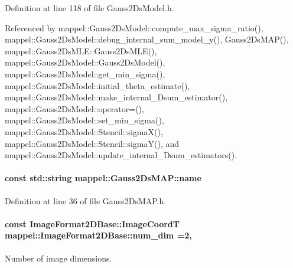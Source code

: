 Definition at line 118 of file Gauss2\+Ds\+Model.\+h.



Referenced by mappel\+::\+Gauss2\+Ds\+Model\+::compute\+\_\+max\+\_\+sigma\+\_\+ratio(), mappel\+::\+Gauss2\+Ds\+Model\+::debug\+\_\+internal\+\_\+sum\+\_\+model\+\_\+y(), Gauss2\+Ds\+M\+A\+P(), mappel\+::\+Gauss2\+Ds\+M\+L\+E\+::\+Gauss2\+Ds\+M\+L\+E(), mappel\+::\+Gauss2\+Ds\+Model\+::\+Gauss2\+Ds\+Model(), mappel\+::\+Gauss2\+Ds\+Model\+::get\+\_\+min\+\_\+sigma(), mappel\+::\+Gauss2\+Ds\+Model\+::initial\+\_\+theta\+\_\+estimate(), mappel\+::\+Gauss2\+Ds\+Model\+::make\+\_\+internal\+\_\+Dsum\+\_\+estimator(), mappel\+::\+Gauss2\+Ds\+Model\+::operator=(), mappel\+::\+Gauss2\+Ds\+Model\+::set\+\_\+min\+\_\+sigma(), mappel\+::\+Gauss2\+Ds\+Model\+::\+Stencil\+::sigma\+X(), mappel\+::\+Gauss2\+Ds\+Model\+::\+Stencil\+::sigma\+Y(), and mappel\+::\+Gauss2\+Ds\+Model\+::update\+\_\+internal\+\_\+Dsum\+\_\+estimators().

\paragraph[{\texorpdfstring{name}{name}}]{\setlength{\rightskip}{0pt plus 5cm}const std\+::string mappel\+::\+Gauss2\+Ds\+M\+A\+P\+::name\hspace{0.3cm}{\ttfamily [static]}}\hypertarget{classmappel_1_1Gauss2DsMAP_adb290940195572b2e22c3c8fce3f11c9}{}\label{classmappel_1_1Gauss2DsMAP_adb290940195572b2e22c3c8fce3f11c9}


Definition at line 36 of file Gauss2\+Ds\+M\+A\+P.\+h.

\paragraph[{\texorpdfstring{num\+\_\+dim}{num_dim}}]{\setlength{\rightskip}{0pt plus 5cm}const {\bf Image\+Format2\+D\+Base\+::\+Image\+CoordT} mappel\+::\+Image\+Format2\+D\+Base\+::num\+\_\+dim =2\hspace{0.3cm}{\ttfamily [static]}, {\ttfamily [inherited]}}\hypertarget{classmappel_1_1ImageFormat2DBase_a9c29fcaf30faffc77b41ba556ebb0127}{}\label{classmappel_1_1ImageFormat2DBase_a9c29fcaf30faffc77b41ba556ebb0127}
Number of image dimensions. 

